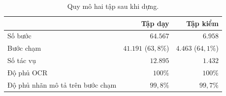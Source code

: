 \documentclass[12pt,a4paper,onecolumn]{article}
\newcommand{\ôvuông}[2]{\tikz[baseline=-0.45ex]{\draw[#1,line width=0.9pt,#2] (0,0) rectangle (0.34,0.18);}}
\newcommand{\bangchu}{\fontsize{10}{12}\selectfont}
\begin{document}
\clearpage
\begin{table}[H]
\centering{}\bangchu

\renewcommand{\arraystretch}{1.2}
\caption{Quy mô hai tập sau khi dựng.}
\label{tab:quymo}
\begin{tabular}{lrr}
\toprule
 & \textbf{Tập dạy} & \textbf{Tập kiểm} \\
\midrule
Số bước & $64.567$ & $6.958$ \\
Bước chạm & $41.191$ ($63{,}8\%$) & $4.463$ ($64{,}1\%$) \\
Số tác vụ & $12.895$ & $1.432$ \\
Độ phủ OCR & $100\%$ & $100\%$ \\
Độ phủ nhãn mô tả trên bước chạm & $99{,}8\%$ & $99{,}7\%$ \\
\bottomrule
\end{tabular}

\end{table}
\end{document}
